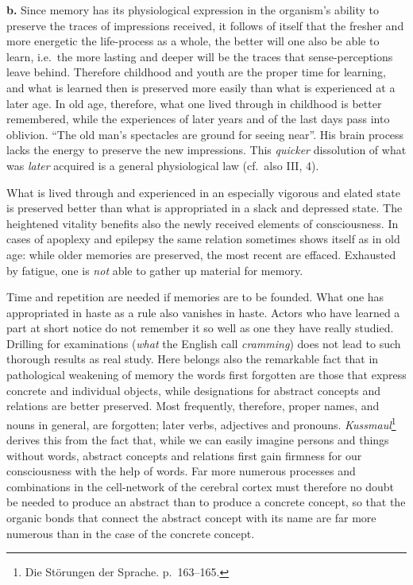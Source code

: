 \documentclass[12pt,a4paper]{book}
\newcommand{\opage}[1]{\marginnote{\footnotesize\textit{[#1]}}}
\begin{document}
\opage{181}\textbf{b.} Since memory has its physiological expression in the
organism's ability to preserve the traces of impressions received, it
follows of itself that the fresher and more energetic the life-process as
a whole, the better will one also be able to learn, i.e.\ the more lasting
and deeper will be the traces that sense-perceptions leave behind.
Therefore childhood and youth are the proper time for learning, and what
is learned then is preserved more easily than what is experienced at a
later age. In old age, therefore, what one lived through in childhood is
better remembered, while the experiences of later years and of the last
days pass into oblivion. ``The old man's spectacles are ground for seeing
near''. His brain process lacks the energy to preserve the new
impressions. This \emph{quicker} dissolution of what was \emph{later}
acquired is a general physiological law (cf.\ also III, 4).

What is lived through and experienced in an especially vigorous and elated
state is preserved better than what is appropriated in a slack and
depressed state. The heightened vitality benefits also the newly received
elements of consciousness. In cases of apoplexy and epilepsy the same
relation sometimes shows itself as in old age: while older memories are
preserved, the most recent are effaced. Exhausted by fatigue, one is
\emph{not} able to gather up material for memory.

Time and repetition are needed if memories are to be founded. What one has
appropriated in haste as a rule also vanishes in haste. Actors who have
learned a part at short notice do not remember it so well as one they have
really studied. Drilling for examinations (\emph{what} the English call
\textit{cramming}) does not lead to such thorough results as real study.
Here belongs also the remarkable fact that in pathological weakening of
memory the words first forgotten are those that express concrete and
individual objects, while designations for abstract concepts and relations
are better preserved. Most frequently, therefore, proper names, and nouns
in general, are forgotten; later verbs, adjectives and pronouns.
\emph{Kussmaul}\footnote{Die Störungen der Sprache. p.~163--165.} derives
this from the fact that, while we can easily imagine persons and things
without words, abstract concepts and relations first gain firmness for our
consciousness with the help of words.
\opage{182}Far more numerous processes and combinations in the cell-network
of the cerebral cortex must therefore no doubt be needed to produce an
abstract than to produce a concrete concept, so that the organic bonds
that connect the abstract concept with its name are far more numerous than
in the case of the concrete concept.
\end{document}

